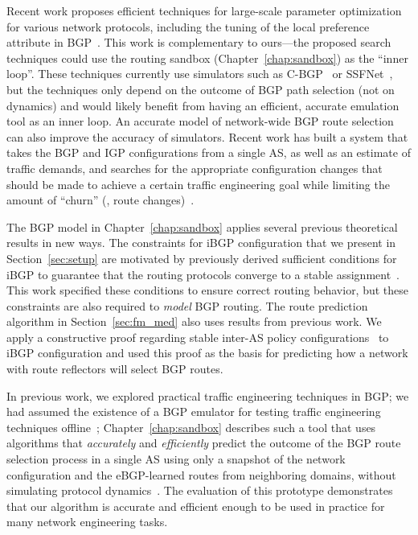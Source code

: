 Recent work proposes efficient techniques for large-scale parameter
optimization for various network protocols, including the tuning of the
local preference attribute in BGP~\cite{Ye2003}.  This work is
complementary to ours---the proposed search techniques could use the
routing sandbox (Chapter~\ref{chap:sandbox}) as the ``inner loop''.
These techniques currently use 
simulators such as C-BGP~\cite{www-cbgp} or SSFNet~\cite{www-ssfnet},
but the techniques only 
depend on the outcome of BGP path selection (not on dynamics) and would
likely benefit from having an efficient, accurate emulation tool as an inner
loop.  An accurate model of network-wide BGP route selection can also
improve the accuracy of simulators.  Recent 
work has built a system that takes the BGP and IGP
configurations from a single AS, as well as an estimate of traffic
demands, and searches for the appropriate configuration changes that
should be made to achieve a certain traffic engineering goal while
limiting the amount of ``churn'' (\ie, route changes)~\cite{Uhlig2004}.



The BGP model in Chapter~\ref{chap:sandbox} applies several previous
theoretical results in new ways.  The constraints for iBGP configuration
that we present in Section~\ref{sec:setup} are motivated by
previously derived sufficient conditions for iBGP to guarantee that the
routing protocols converge to a stable
assignment~\cite{Griffin2002b,Griffin2002}.  This work specified these
conditions to ensure correct routing behavior, but these constraints are
also required to {\em model} BGP routing.
%
The route prediction algorithm in Section~\ref{sec:fm_med} 
also uses results from previous work. We 
apply a constructive proof regarding stable inter-AS policy
configurations~\cite{Gao2001a} to iBGP configuration and used this proof
as the basis for predicting how a network with route reflectors will
select BGP routes.
%

In previous work, we explored practical traffic engineering techniques
in BGP; we had assumed the existence of a BGP emulator for testing traffic
engineering techniques offline~\cite{Feamster2003e};
Chapter~\ref{chap:sandbox} describes such a tool that uses algorithms
that {\em accurately} and {\em 
efficiently} predict the outcome of the BGP route selection process in
a single AS using only a snapshot of the network configuration and the
eBGP-learned routes from neighboring domains, without simulating
protocol dynamics~\cite{Feamster2004}.  The evaluation of this prototype
demonstrates that our algorithm is
accurate and efficient enough to be used in practice for many network
engineering tasks.  


